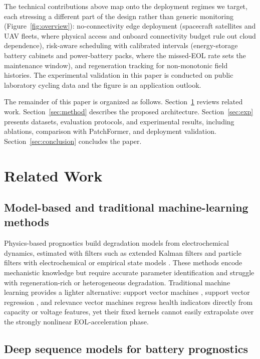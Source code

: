 \documentclass[final,5p,times,twocolumn]{elsarticle}
\begin{document}
The technical contributions above map onto the deployment regimes we
target, each stressing a different part of the design rather than
generic monitoring (Figure~\ref{fig:overview}):
no-connectivity edge deployment (spacecraft satellites
and UAV fleets, where physical access and onboard
connectivity budget rule out cloud dependence), risk-aware
scheduling with calibrated intervals (energy-storage battery
cabinets and power-battery packs, where the missed-EOL rate sets
the maintenance window), and regeneration tracking for
non-monotonic field histories. The experimental
validation in this paper is conducted on public laboratory cycling
data and the figure is an application outlook.


The remainder of this paper is organized as follows.
Section~\ref{sec:related} reviews related work.
Section~\ref{sec:method} describes the proposed architecture.
Section~\ref{sec:exp} presents datasets, evaluation protocols, and
experimental results, including ablations, comparison with
PatchFormer, and deployment validation.
Section~\ref{sec:conclusion} concludes the paper.

\section{Related Work}
\label{sec:related}

\subsection{Model-based and traditional machine-learning methods}

Physics-based prognostics build degradation models from electrochemical
dynamics, estimated with filters such as extended Kalman filters
\cite{ref_ekf_yan} and particle filters with electrochemical or empirical state models
\cite{ref_pf_echem,ref_pf_rbf,ref_pf_lui}. These methods encode
mechanistic knowledge but require accurate parameter identification
and struggle with regeneration-rich or heterogeneous degradation.
Traditional machine learning provides a lighter alternative:
support vector machines \cite{ref_svm_klass,ref_svm_patil}, support
vector regression \cite{ref_svr_wang}, and relevance vector machines
\cite{ref_rvm_guo} regress health indicators directly from capacity
or voltage features, yet their fixed kernels cannot easily extrapolate
over the strongly nonlinear EOL-acceleration phase.

\subsection{Deep sequence models for battery prognostics}
\end{document}

